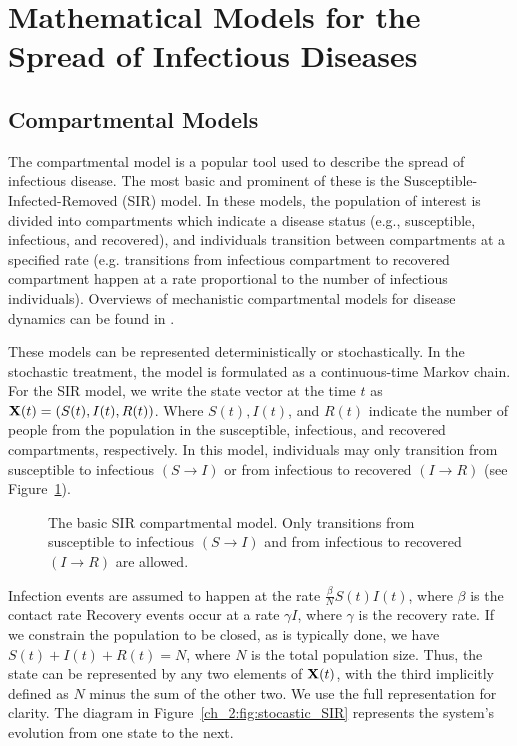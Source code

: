 \section{Mathematical Models for the Spread of Infectious Diseases}
\label{sec:math_models}

\subsection{Compartmental Models}

The compartmental model is a popular tool used to describe the spread of infectious disease.
The most basic and prominent of these is the Susceptible-Infected-Removed (SIR) model.
In these models, the population of interest is divided into compartments which indicate a disease status (e.g., susceptible, infectious, and recovered), and individuals transition between compartments at a specified rate
(e.g. transitions from infectious compartment to recovered compartment happen at a rate proportional to the number of infectious individuals).
Overviews of mechanistic compartmental models for disease dynamics can be found in \citet{anderson1992infectious, Brauer2008, keeling2011modeling, 10.1093/aje/kww021}.

These models can be represented deterministically or stochastically.
In the stochastic treatment, the model is formulated as a continuous-time Markov chain.
For the SIR model, we write the state vector at the time \( t \) as \( \mathbf{X}(t) = (S(t), I(t), R(t)) \).
Where \( S(t), I(t) \), and \( R(t) \) indicate the number of people from the population in the susceptible, infectious, and recovered compartments, respectively.
In this model, individuals may only transition from susceptible to infectious \( (S \to I) \) or from infectious to recovered \( (I \to R) \) (see Figure~\ref{fig:ch_2:SIR_diagram}).
\begin{figure}
    \centering
    \caption{The basic SIR compartmental model.
    Only transitions from susceptible to infectious \( (S \to I) \) and from infectious to recovered \( (I \to R) \) are allowed.}
    \label{fig:ch_2:SIR_diagram}
\end{figure}
Infection events are assumed to happen at the rate \( \frac{\beta}{N} S(t) I(t) \), where \( \beta \) is the contact rate
Recovery events occur at a rate \( \gamma I \), where \( \gamma \) is the recovery rate.
If we constrain the population to be closed, as is typically done, we have \(  S(t) + I(t) + R(t) = N \), where \( N \) is the total population size.
Thus, the state can be represented by any two elements of \( \mathbf{X} (t) \), with the third implicitly defined as \( N \) minus the sum of the other two.
We use the full representation for clarity.
The diagram in Figure~\ref{ch_2:fig:stocastic_SIR} represents the system's evolution from one state to the next.


